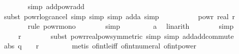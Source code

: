 \begin{isabellebody}
\ \ \ \ \ \ \isamarkupfalse%
\ {\isacharparenleft}{\kern0pt}simp\ add{\isacharcolon}{\kern0pt}powr{\isacharunderscore}{\kern0pt}add{\isacharparenright}{\kern0pt}\isanewline
\ \ \ \ \ \ \isamarkupfalse%
\ {\isacharparenleft}{\kern0pt}subst\ powr{\isacharunderscore}{\kern0pt}log{\isacharunderscore}{\kern0pt}cancel{\isacharcomma}{\kern0pt}\ simp{\isacharcomma}{\kern0pt}\ simp{\isacharcomma}{\kern0pt}\ simp\ add{\isacharcolon}{\kern0pt}a{\isacharcomma}{\kern0pt}\ simp{\isacharparenright}{\kern0pt}\isanewline
\ \ \ \ \isamarkupfalse%
\ \isamarkupfalse%
\ {\isachardoublequoteopen}{\isachardot}{\kern0pt}{\isachardot}{\kern0pt}{\isachardot}{\kern0pt}\ {\isasymle}\ {}\ powr\ {\isacharparenleft}{\kern0pt}real\ r\ {\isacharplus}{\kern0pt}\ {}{\isacharparenright}{\kern0pt}{\isachardoublequoteclose}\isanewline
\ \ \ \ \ \ \isamarkupfalse%
\ {\isacharparenleft}{\kern0pt}rule\ powr{\isacharunderscore}{\kern0pt}mono{\isacharparenright}{\kern0pt}\isanewline
\ \ \ \ \ \ \isamarkupfalse%
\ simp\ \isanewline
\ \ \ \ \ \ \isamarkupfalse%
\ a\ \isamarkupfalse%
\ linarith\isanewline
\ \ \ \ \ \ \isamarkupfalse%
\ simp\isanewline
\ \ \ \ \isamarkupfalse%
\ \isamarkupfalse%
\ {\isachardoublequoteopen}{\isachardot}{\kern0pt}{\isachardot}{\kern0pt}{\isachardot}{\kern0pt}\ {\isacharequal}{\kern0pt}\ {}\ {\isacharcircum}{\kern0pt}\ {\isacharparenleft}{\kern0pt}r{\isacharplus}{\kern0pt}{}{\isacharparenright}{\kern0pt}{\isachardoublequoteclose}\isanewline
\ \ \ \ \ \ \isamarkupfalse%
\ {\isacharparenleft}{\kern0pt}subst\ powr{\isacharunderscore}{\kern0pt}realpow{\isacharbrackleft}{\kern0pt}symmetric{\isacharbrackright}{\kern0pt}{\isacharcomma}{\kern0pt}\ simp{\isacharcomma}{\kern0pt}\ simp\ add{\isacharcolon}{\kern0pt}add{\isachardot}{\kern0pt}commute{\isacharparenright}{\kern0pt}\isanewline
\ \ \ \ \isamarkupfalse%
\ \isamarkupfalse%
\ {\isachardoublequoteopen}abs\ q\ {\isasymle}\ {}\ {\isacharcircum}{\kern0pt}\ {\isacharparenleft}{\kern0pt}r{\isacharplus}{\kern0pt}{}{\isacharparenright}{\kern0pt}{\isachardoublequoteclose}\ \isanewline
\ \ \ \ \ \ \isamarkupfalse%
\ {\isacharparenleft}{\kern0pt}metis\ of{\isacharunderscore}{\kern0pt}int{\isacharunderscore}{\kern0pt}le{\isacharunderscore}{\kern0pt}iff\ of{\isacharunderscore}{\kern0pt}int{\isacharunderscore}{\kern0pt}numeral\ of{\isacharunderscore}{\kern0pt}int{\isacharunderscore}{\kern0pt}power{\isacharparenright}{\kern0pt}\isanewline

\end{isabellebody}
